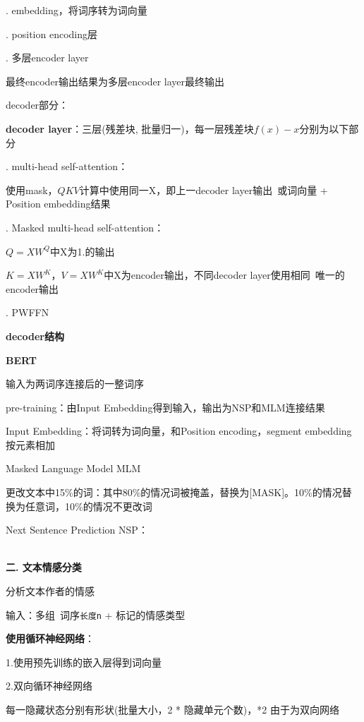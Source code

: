 \documentclass[UTF8]{ctexart}
\begin{document}
  \quad {}. embedding，将词序转为词向量

  \quad {}. position encoding层

  \quad {}. 多层encoder layer

  \quad \quad 最终encoder输出结果为多层encoder layer最终输出

  decoder部分：

  \quad \textbf{decoder layer}：三层(残差块, 批量归一)，每一层残差块$f(x) - x$分别为以下部分

  \quad {}. multi-head self-attention：
  
  \quad \quad \quad 使用mask，$QKV$计算中使用同一X，即上一decoder layer输出\ 或词向量 + Position embedding结果 
  
  \quad {}. Masked multi-head self-attention：
  
  \quad \quad \quad $Q = XW^Q$中X为1.的输出
  
  \quad \quad \quad $K = XW^K$，$V = XW^K$中X为encoder输出，不同decoder layer使用相同\ 唯一的encoder输出

  \quad {}. PWFFN

  \quad \textbf{decoder结构}

  \quad \quad 
  
\textbf{BERT}

  输入为两词序连接后的一整词序

  pre-training：由Input Embedding得到输入，输出为NSP和MLM连接结果

  \quad Input Embedding：将词转为词向量，和Position encoding，segment embedding按元素相加
  
  \quad Masked Language Model MLM
  
  \quad \quad 更改文本中15\%的词：其中80\%的情况词被掩盖，替换为[MASK]。10\%的情况替换为任意词，10\%的情况不更改词
  
  \quad Next Sentence Prediction NSP：
  
  \quad \quad \\
\textbf{二. 文本情感分类}

  分析文本作者的情感

  输入：多组\ 词序\texttt{长度n} + 标记的情感类型

  \textbf{使用循环神经网络}：

  \quad 1.使用预先训练的嵌入层得到词向量

  \quad 2.双向循环神经网络

  \quad \quad 每一隐藏状态分别有形状(批量大小，2 * 隐藏单元个数)，*2 由于为双向网络
\end{document}
